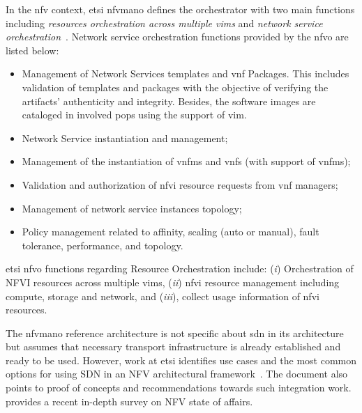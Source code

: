 In the \gls{nfv} context, \gls{etsi} \gls{nfvmano} defines the orchestrator with two main functions including \textit{resources orchestration across multiple \glspl{vim}} and \textit{network service orchestration}~\cite{GSNFV-MAN001:2014}. Network service orchestration functions provided by the \gls{nfvo} are listed below:
\begin{itemize}
\item Management of Network Services templates and \gls{vnf} Packages. This includes validation of templates and packages with the objective of verifying the artifacts' authenticity and integrity. Besides, the software images are cataloged in involved \glspl{pop} using the support of \gls{vim}.
\item Network Service instantiation and management;
\item Management of the instantiation of \glspl{vnfm} and \glspl{vnf} (with support of \glspl{vnfm});
\item Validation and authorization of \gls{nfvi} resource requests from \gls{vnf} managers;
\item Management of network service instances topology;
\item Policy management related to affinity, scaling (auto or manual), fault tolerance, performance, and topology.
\end{itemize}

\gls{etsi} \gls{nfvo} functions regarding Resource Orchestration include: (\textit{i})  Orchestration of NFVI resources across multiple \glspl{vim}, (\textit{ii})  \gls{nfvi} resource management including compute, storage and network, and (\textit{iii}), collect usage information of \gls{nfvi} resources.

The \gls{nfvmano} reference architecture is not  specific about \gls{sdn} in its architecture but  assumes that necessary transport infrastructure is already established and ready to be used. However, work at \gls{etsi} identifies use cases and the most common options for using SDN in an NFV architectural framework~\cite{ETSINetworkFramework}. The document also points to  proof of concepts and recommendations towards such integration work.
\cite{nfv-survey18} provides a recent in-depth survey on NFV state of affairs. 


